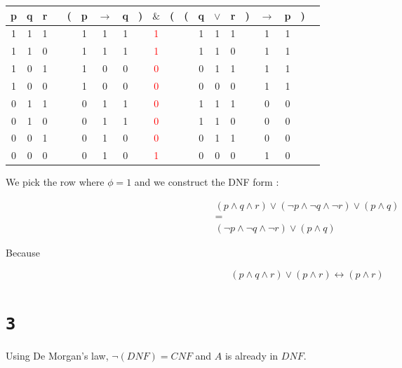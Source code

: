 \documentclass[a4paper,11pt]{report}
\begin{document}
\begin{center}
  \begin{tabular}{@{ }c@{ }@{ }c@{ }@{ }c | c@{ }@{}c@{}@{ }c@{ }@{ }c@{ }@{ }c@{ }@{}c@{}@{ }c@{ }@{}c@{}@{}c@{}@{ }c@{ }@{ }c@{ }@{ }c@{ }@{}c@{}@{ }c@{ }@{ }c@{ }@{}c@{}@{ }c}
    p & q & r &  & ( & p & $\rightarrow$ & q & ) & $\&$ & ( & ( & q & $\lor$ & r & ) & $\rightarrow$ & p & ) & \\
    \hline 
    1 & 1 & 1 &  &  & 1 & 1 & 1 &  & \textcolor{red}{1} &  &  & 1 & 1 & 1 &  & 1 & 1 &  & \\
    1 & 1 & 0 &  &  & 1 & 1 & 1 &  & \textcolor{red}{1} &  &  & 1 & 1 & 0 &  & 1 & 1 &  & \\
    1 & 0 & 1 &  &  & 1 & 0 & 0 &  & \textcolor{red}{0} &  &  & 0 & 1 & 1 &  & 1 & 1 &  & \\
    1 & 0 & 0 &  &  & 1 & 0 & 0 &  & \textcolor{red}{0} &  &  & 0 & 0 & 0 &  & 1 & 1 &  & \\
    0 & 1 & 1 &  &  & 0 & 1 & 1 &  & \textcolor{red}{0} &  &  & 1 & 1 & 1 &  & 0 & 0 &  & \\
    0 & 1 & 0 &  &  & 0 & 1 & 1 &  & \textcolor{red}{0} &  &  & 1 & 1 & 0 &  & 0 & 0 &  & \\
    0 & 0 & 1 &  &  & 0 & 1 & 0 &  & \textcolor{red}{0} &  &  & 0 & 1 & 1 &  & 0 & 0 &  & \\
    0 & 0 & 0 &  &  & 0 & 1 & 0 &  & \textcolor{red}{1} &  &  & 0 & 0 & 0 &  & 1 & 0 &  & \\
  \end{tabular}
\end{center}

We pick the row where $\phi = 1$ and we construct the DNF form :

\begin{gather*}
  (p \wedge q \wedge r) \vee (\neg p \wedge \neg q \wedge \neg r) \vee (p \wedge
  q) \\ = \\ (\neg p \wedge \neg q \wedge \neg r) \vee (p \wedge
  q)
\end{gather*}

Because

\[
  (p \wedge q \wedge r) \vee (p \wedge r) \leftrightarrow  (p \wedge r)
\]

\section*{\texttt{3}}

Using De Morgan's law, $\neg(DNF) = CNF$ and $A$ is already in $DNF$.
\end{document}

